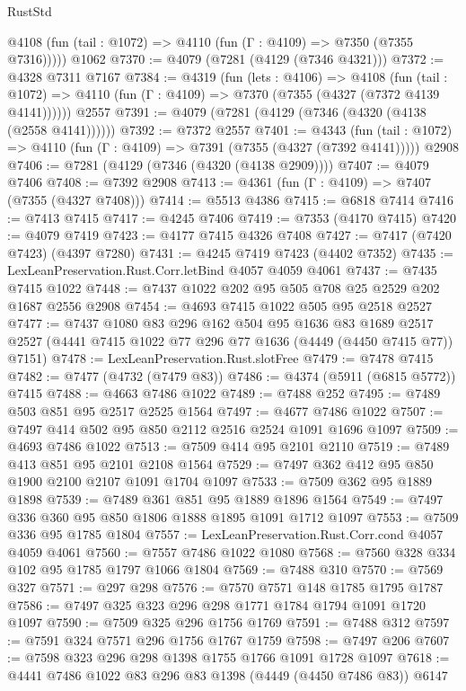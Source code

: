 \begin{lexlean}{RustStd}
\begin{coremodule}
      @4108 (fun (tail : @1072) => @4110 (fun (Γ : @4109) => @7350 (@7355 @7316)))))
    @1062
@7370 := @4079 (@7281 (@4129 (@7346 @4321)))
@7372 := @4328 @7311 @7167
@7384 := @4319
    (fun (lets : @4106) =>
    @4108
      (fun (tail : @1072) => @4110 (fun (Γ : @4109) => @7370 (@7355 (@4327 (@7372 @4139 @4141))))))
    @2557
@7391 := @4079 (@7281 (@4129 (@7346 (@4320 (@4138 (@2558 @4141))))))
@7392 := @7372 @2557
@7401 := @4343
    (fun (tail : @1072) => @4110 (fun (Γ : @4109) => @7391 (@7355 (@4327 (@7392 @4141)))))
    @2908
@7406 := @7281 (@4129 (@7346 (@4320 (@4138 @2909))))
@7407 := @4079 @7406
@7408 := @7392 @2908
@7413 := @4361 (fun (Γ : @4109) => @7407 (@7355 (@4327 @7408)))
@7414 := @5513 @4386
@7415 := @6818 @7414
@7416 := @7413 @7415
@7417 := @4245 @7406
@7419 := @7353 (@4170 @7415)
@7420 := @4079 @7419
@7423 := @4177 @7415 @4326 @7408
@7427 := @7417 (@7420 @7423) (@4397 @7280)
@7431 := @4245 @7419 @7423 (@4402 @7352)
@7435 := LexLeanPreservation.Rust.Corr.letBind @4057 @4059 @4061
@7437 := @7435 @7415 @1022
@7448 := @7437 @1022 @202 @95 @505 @708 @25 @2529 @202 @1687 @2556 @2908
@7454 := @4693 @7415 @1022 @505 @95 @2518 @2527
@7477 := @7437
    @1080
    @83
    @296
    @162
    @504
    @95
    @1636
    @83
    @1689
    @2517
    @2527
    (@4441 @7415 @1022 @77 @296 @77 @1636 (@4449 (@4450 @7415 @77)) @7151)
@7478 := LexLeanPreservation.Rust.slotFree
@7479 := @7478 @7415
@7482 := @7477 (@4732 (@7479 @83))
@7486 := @4374 (@5911 (@6815 @5772)) @7415
@7488 := @4663 @7486 @1022
@7489 := @7488 @252
@7495 := @7489 @503 @851 @95 @2517 @2525 @1564
@7497 := @4677 @7486 @1022
@7507 := @7497 @414 @502 @95 @850 @2112 @2516 @2524 @1091 @1696 @1097
@7509 := @4693 @7486 @1022
@7513 := @7509 @414 @95 @2101 @2110
@7519 := @7489 @413 @851 @95 @2101 @2108 @1564
@7529 := @7497 @362 @412 @95 @850 @1900 @2100 @2107 @1091 @1704 @1097
@7533 := @7509 @362 @95 @1889 @1898
@7539 := @7489 @361 @851 @95 @1889 @1896 @1564
@7549 := @7497 @336 @360 @95 @850 @1806 @1888 @1895 @1091 @1712 @1097
@7553 := @7509 @336 @95 @1785 @1804
@7557 := LexLeanPreservation.Rust.Corr.cond @4057 @4059 @4061
@7560 := @7557 @7486 @1022 @1080
@7568 := @7560 @328 @334 @102 @95 @1785 @1797 @1066 @1804
@7569 := @7488 @310
@7570 := @7569 @327
@7571 := @297 @298
@7576 := @7570 @7571 @148 @1785 @1795 @1787
@7586 := @7497 @325 @323 @296 @298 @1771 @1784 @1794 @1091 @1720 @1097
@7590 := @7509 @325 @296 @1756 @1769
@7591 := @7488 @312
@7597 := @7591 @324 @7571 @296 @1756 @1767 @1759
@7598 := @7497 @206
@7607 := @7598 @323 @296 @298 @1398 @1755 @1766 @1091 @1728 @1097
@7618 := @4441 @7486 @1022 @83 @296 @83 @1398 (@4449 (@4450 @7486 @83)) @6147

\end{coremodule}
\end{lexlean}
